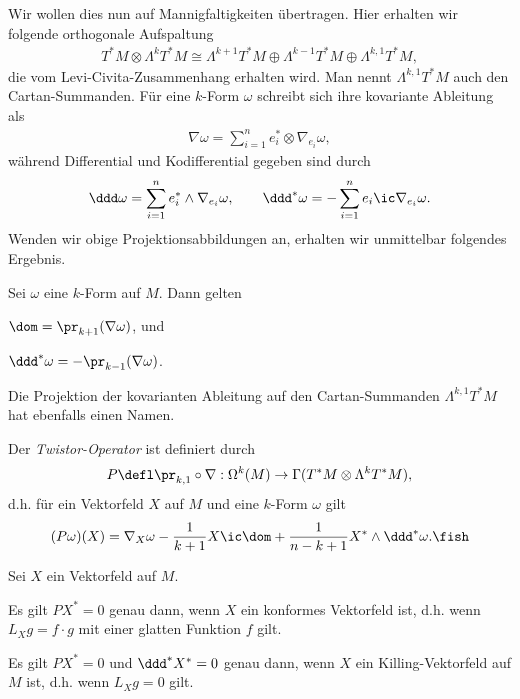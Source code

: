 \documentclass[%
	paper=a5,%
	fleqn,%
	DIV=18,%
	BCOR=0mm,
	fontsize=11pt,
	titlepage=false,%
	bibliography=totoc,
	DIV=18,%
	twoside=true,
	pdftitle=Riemannsche Geometrie,
	pdfauthor=Uwe Semmelmann,
	numbers=noendperiod]%
	{scrbook}
\begin{document}
Wir wollen dies nun auf Mannigfaltigkeiten übertragen. Hier erhalten wir folgende orthogonale Aufspaltung
\begin{align*}
T^*M \otimes \Lambda^k T^*M \cong \Lambda^{k+1}T^*M \oplus \Lambda^{k-1}T^*M \oplus \Lambda^{k,1}T^*M,
\end{align*}
die vom Levi-Civita-Zusammenhang erhalten wird. Man nennt $\Lambda^{k,1}T^*M$ auch den Cartan-Summanden. Für eine $k$-Form $\omega$ schreibt sich ihre kovariante Ableitung als
\begin{align*}
\nabla \omega = \sum_{i=1}^n e_{i}^* \otimes \nabla_{e_{i}}\omega,
\end{align*}
während Differential und Kodifferential gegeben sind durch
\begin{align*}
\ddd \omega = \sum_{i=1}^n e_{i}^* \wedge \nabla_{e_{i}}\omega,\qquad
\ddd^* \omega = -\sum_{i=1}^n e_{i} \ic \nabla_{e_{i}}\omega.
\end{align*}
Wenden wir obige Projektionsabbildungen an, erhalten wir unmittelbar folgendes Ergebnis.

\begin{lem}
Sei $\omega$ eine $k$-Form auf $M$. Dann gelten
\begin{propenum}
\item $\dom = \pr_{k+1}(\nabla \omega)$, und
\item $\ddd^*\omega = -\pr_{k-1}(\nabla \omega)$.\fish
\end{propenum}
\end{lem}

Die Projektion der kovarianten Ableitung auf den Cartan-Summanden $\Lambda^{k,1}T^*M$ hat ebenfalls einen Namen.

\begin{defn}
Der \emph{Twistor-Operator} ist definiert durch
\begin{align*}
P\defl \pr_{k,1}\circ \nabla : \Omega^k(M)\to \Gamma(T^*M\otimes \Lambda^k T^*M),
\end{align*}
d.h. für ein Vektorfeld $X$ auf $M$ und eine $k$-Form $\omega$ gilt
\begin{align*}
(P\omega)(X) = \nabla_{X}\omega - \frac{1}{k+1}X \ic \dom + \frac{1}{n-k+1} X^*\wedge \ddd^*\omega.\fish
\end{align*}
\end{defn}

\begin{lem}
\label{lem:Killing-Twistor}
Sei $X$ ein Vektorfeld auf $M$.
\begin{propenum}
\item Es gilt $PX^* = 0$ genau dann, wenn $X$ ein konformes Vektorfeld ist, d.h. wenn $L_{X}g = f\cdot g$ mit einer glatten Funktion $f$ gilt.
\item Es gilt $PX^* = 0$ und $\ddd^* X^* = 0$ genau dann, wenn $X$ ein Killing-Vektorfeld auf $M$ ist, d.h. wenn $L_{X}g = 0$ gilt.\fish
\end{propenum}
\end{lem}
\end{document}

